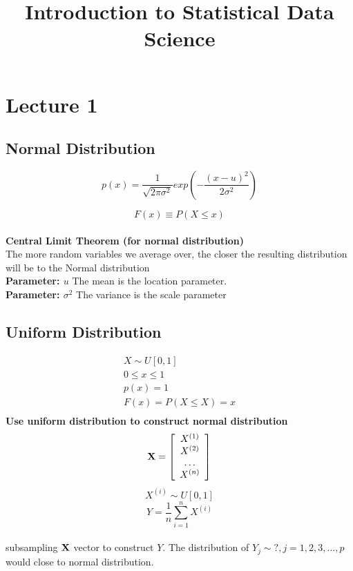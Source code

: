 \documentclass[12pt,a4paper]{article}
\title{Introduction to Statistical Data Science}
\begin{document}
 

\baselineskip24pt
\maketitle 

\section{Lecture 1}

\subsection{Normal Distribution}
$$
p(x) = \frac{1}{\sqrt{2\pi\sigma^2}}exp{(-\frac{(x-u)^2}{2\sigma^2})}
$$

$$
F(x)\equiv P(X\leq x)
$$
\\
{\bf{Central Limit Theorem (for normal distribution)}}\\
The more random variables we average over, the closer the resulting
distribution will be to the Normal distribution
\\
{\bf Parameter: $u$}
The mean is the location parameter.\\
{\bf Parameter: $\sigma^2$}
The variance is the scale parameter\\

\subsection{Uniform Distribution}
\begin{eqnarray}
X \sim U[0,1] \\
0\leq x \leq 1\\
p(x) = 1 \\
F(x) = P(X\leq X)=x\\
\end{eqnarray}
{\bf Use uniform distribution to construct normal distribution}\\
\begin{equation}
{\bf X} = \left[
\begin{array}{c}
X^{(1)} \\
X^{(2)} \\
\ldots \\
X^{(n)} \\
\end{array}
\right]
\end{equation}
$$
X^{(i)} \sim U[0,1]
$$
$$
Y = \frac{1}{n}\sum_{i=1}^{n}X^{(i)}
$$\\
subsampling $\bf X$ vector to construct $Y$. The distribution of $Y_j \sim ?, j=1,2,3,\ldots,p$ would close to normal distribution.
\end{document}
